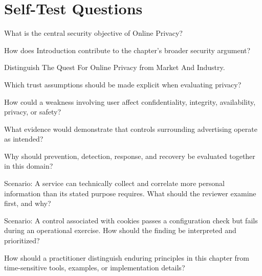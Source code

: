 \documentclass[11pt,letterpaper]{article}
\begin{document}
\section*{Self-Test Questions}
\begin{CornellRecallList}
\item What is the central security objective of Online Privacy?
\item How does Introduction contribute to the chapter's broader security argument?
\item Distinguish The Quest For Online Privacy from Market And Industry.
\item Which trust assumptions should be made explicit when evaluating privacy?
\item How could a weakness involving user affect confidentiality, integrity, availability, privacy, or safety?
\item What evidence would demonstrate that controls surrounding advertising operate as intended?
\item Why should prevention, detection, response, and recovery be evaluated together in this domain?
\item Scenario: A service can technically collect and correlate more personal information than its stated purpose requires. What should the reviewer examine first, and why?
\item Scenario: A control associated with cookies passes a configuration check but fails during an operational exercise. How should the finding be interpreted and prioritized?
\item How should a practitioner distinguish enduring principles in this chapter from time-sensitive tools, examples, or implementation details?
\end{CornellRecallList}
\end{document}
